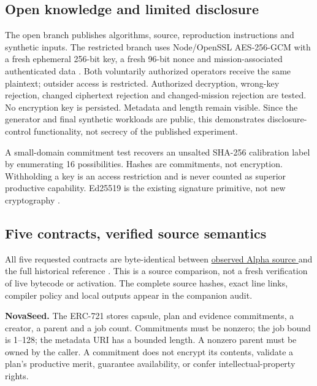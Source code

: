 
\subsection{Open knowledge and limited disclosure}
The open branch publishes algorithms, source, reproduction instructions and synthetic inputs. The restricted branch uses Node/OpenSSL AES-256-GCM with a fresh ephemeral 256-bit key, a fresh 96-bit nonce and mission-associated authenticated data \citep{dworkin2007}. Both voluntarily authorized operators receive the same plaintext; outsider access is restricted. Authorized decryption, wrong-key rejection, changed ciphertext rejection and changed-mission rejection are tested. No encryption key is persisted. Metadata and length remain visible. Since the generator and final synthetic workloads are public, this demonstrates disclosure-control functionality, not secrecy of the published experiment.

A small-domain commitment test recovers an unsalted SHA-256 calibration label by enumerating 16 possibilities. Hashes are commitments, not encryption. Withholding a key is an access restriction and is never counted as superior productive capability. Ed25519 is the existing signature primitive, not new cryptography \citep{rfc8032}.

\subsection{Five contracts, verified source semantics}
All five requested contracts are byte-identical between \href{https://github.com/MontrealAI/AGI-Alpha-Agent-v0/tree/197147ffd22c5ae13113162afffaf3ce9c10aa2e/contracts/ascension}{observed Alpha source } and the full historical reference . This is a source comparison, not a fresh verification of live bytecode or activation. The complete source hashes, exact line links, compiler policy and local outputs appear in the companion audit.

\textbf{NovaSeed.} The ERC-721 stores capsule, plan and evidence commitments, a creator, a parent and a job count. Commitments must be nonzero; the job bound is 1--128; the metadata URI has a bounded length. A nonzero parent must be owned by the caller. A commitment does not encrypt its contents, validate a plan's productive merit, guarantee availability, or confer intellectual-property rights.

